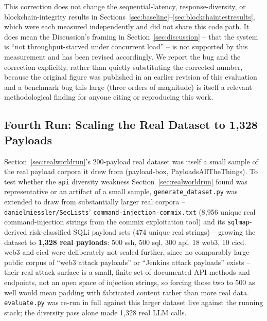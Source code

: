 \documentclass[conference]{IEEEtran}
\begin{document}
This correction does not change the sequential-latency, response-diversity,
or blockchain-integrity results in
Sections~\ref{sec:baseline}--\ref{sec:blockchaintestresults}, which were
each measured independently and did not share this code path. It does mean
the Discussion's framing in Section~\ref{sec:discussion} -- that the system
is ``not throughput-starved under concurrent load'' -- is not supported by
this measurement and has been revised accordingly. We report the bug and
the correction explicitly, rather than quietly substituting the corrected
number, because the original figure was published in an earlier revision
of this evaluation and a benchmark bug this large (three orders of
magnitude) is itself a relevant methodological finding for anyone citing or
reproducing this work.

\subsection{Fourth Run: Scaling the Real Dataset to 1{,}328 Payloads}
\label{sec:scaledrun}

Section~\ref{sec:realworldrun}'s 200-payload real dataset was itself a
small sample of the real payload corpora it drew from (payload-box,
PayloadsAllTheThings). To test whether the \texttt{api} diversity weakness
Section~\ref{sec:realworldrun} found was representative or an artifact of a
small sample, \texttt{generate\_dataset.py} was extended to draw from
substantially larger real corpora -- \texttt{danielmiessler/SecLists}'
\texttt{command-injection-commix.txt} (8{,}956 unique real
command-injection strings from the commix exploitation tool) and its
\texttt{sqlmap}-derived risk-classified SQLi payload sets (474 unique real
strings) -- growing the dataset to \textbf{1{,}328 real payloads}: 500
ssh, 500 sql, 300 api, 18 web3, 10 cicd. web3 and cicd were deliberately
not scaled further, since no comparably large public corpus of ``web3
attack payloads'' or ``Jenkins attack payloads'' exists -- their real
attack surface is a small, finite set of documented API methods and
endpoints, not an open space of injection strings, so forcing those two to
500 as well would mean padding with fabricated content rather than more
real data. \texttt{evaluate.py} was re-run in full against this larger
dataset live against the running stack; the diversity pass alone made
1{,}328 real LLM calls.
\end{document}
